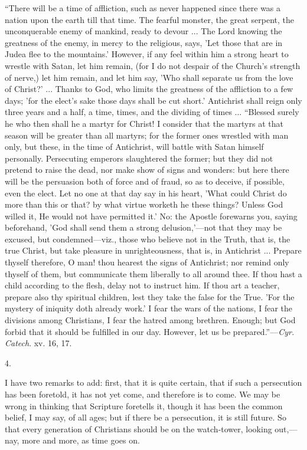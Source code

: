 ``There will be a time of affliction, such as never happened
since there was a nation upon the earth till that time. The fearful
monster, the great serpent, the unconquerable enemy of mankind, ready
to devour ... The Lord knowing the greatness of the enemy, in mercy to
the religious, says, 'Let those that are in Judea flee to the
mountains.' However, if any feel within him a strong heart to wrestle
with Satan, let him remain, (for I do not despair of the Church's
strength of nerve,) let him remain, and let him say, 'Who shall
separate us from the love of Christ?' ... Thanks to God, who limits
the greatness of the affliction to a few days; 'for the elect's sake
those days shall be cut short.' Antichrist shall reign only
three years and a half, a time, times, and the dividing of times
... ``Blessed surely he who then shall he a martyr for Christ! I
consider that the martyrs at that season will be greater than all
martyrs; for the former ones wrestled with man only, but these, in the
time of Antichrist, will battle with Satan himself personally.
Persecuting emperors slaughtered the former; but they did not pretend
to raise the dead, nor make show of signs and wonders: but here there
will be the persuasion both of force and of fraud, so as to deceive,
if possible, even the elect. Let no one at that day say in his heart,
'What could Christ do more than this or that? by what virtue worketh
he these things? Unless God willed it, He would not have permitted
it.' No: the Apostle forewarns you, saying beforehand, 'God shall send
them a strong delusion,'—not that they may be excused, but condemned—viz.,
those who believe not in the Truth, that is, the true Christ, but take
pleasure in unrighteousness, that is, in Antichrist ... Prepare
thyself therefore, O man! thou hearest the signs of Antichrist; nor
remind only thyself of them, but communicate them liberally to all
around thee. If thou hast a child according to the flesh, delay not to
instruct him. If thou art a teacher, prepare also thy spiritual
children, lest they take the false for the True. 'For the mystery of
iniquity doth already work.' I fear the wars of the nations, I fear
the divisions among Christians, I fear the hatred among brethren.
Enough; but God forbid that it should be fulfilled in our day.
However, let us be prepared.''—\emph{Cyr. Catech}. xv. 16, 17.

4.

I have two remarks to add: first, that it is quite certain, that if
such a persecution has been foretold, it has not yet come, and
therefore is to come. We may be wrong in thinking that Scripture
foretells it, though it has been the common belief, I may say, of all
ages; but if there be a persecution, it is still future. So that every
generation of Christians should be on the watch-tower, looking out,—nay,
more and more, as time goes on.

